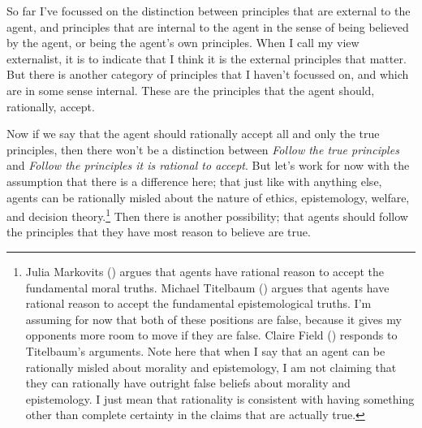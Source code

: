 \documentclass[
  10pt,
  letterpaper,
  twoside]{scrbook}
\begin{document}
So far I've focussed on the distinction between principles that are
external to the agent, and principles that are internal to the agent in
the sense of being believed by the agent, or being the agent's own
principles. When I call my view externalist, it is to indicate that I
think it is the external principles that matter. But there is another
category of principles that I haven't focussed on, and which are in some
sense internal. These are the principles that the agent should,
rationally, accept.

Now if we say that the agent should rationally accept all and only the
true principles, then there won't be a distinction between \emph{Follow
the true principles} and \emph{Follow the principles it is rational to
accept}. But let's work for now with the assumption that there is a
difference here; that just like with anything else, agents can be
rationally misled about the nature of ethics, epistemology, welfare, and
decision theory.\footnote{Julia Markovits
  () argues that agents have rational
  reason to accept the fundamental moral truths. Michael Titelbaum
  () argues that agents have rational
  reason to accept the fundamental epistemological truths. I'm assuming
  for now that both of these positions are false, because it gives my
  opponents more room to move if they are false. Claire Field
  () responds to Titelbaum's
  arguments. Note here that when I say that an agent can be rationally
  misled about morality and epistemology, I am not claiming that they
  can rationally have outright false beliefs about morality and
  epistemology. I just mean that rationality is consistent with having
  something other than complete certainty in the claims that are
  actually true.} Then there is another possibility; that agents should
follow the principles that they have most reason to believe are true.
\end{document}
